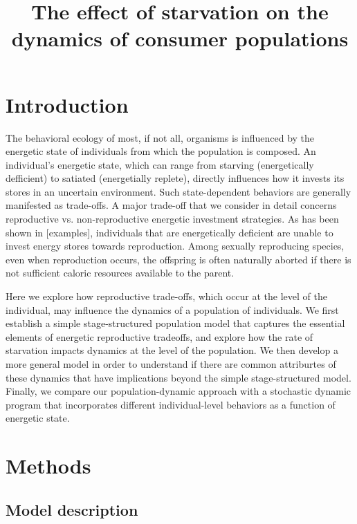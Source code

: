 \documentclass[11pt]{article}
\begin{document}
\title{The effect of starvation on the dynamics of consumer populations}
\maketitle


\section{Introduction}

The behavioral ecology of most, if not all, organisms is influenced by the energetic state of individuals from which the population is composed.
An individual's energetic state, which can range from starving (energetically defficient) to satiated (energetially replete), directly influences how it invests its stores in an uncertain environment.
Such state-dependent behaviors are generally manifested as trade-offs.
A major trade-off that we consider in detail concerns reproductive vs. non-reproductive energetic investment strategies.
As has been shown in [examples], individuals that are energetically deficient are unable to invest energy stores towards reproduction.
Among sexually reproducing species, even when reproduction occurs, the offspring is often naturally aborted if there is not sufficient caloric resources available to the parent.

Here we explore how reproductive trade-offs, which occur at the level of the individual, may influence the dynamics of a population of individuals.
We first establish a simple stage-structured population model that captures the essential elements of energetic reproductive tradeoffs, and explore how the rate of starvation impacts dynamics at the level of the population.
We then develop a more general model in order to understand if there are common attriburtes of these dynamics that have implications beyond the simple stage-structured model.
Finally, we compare our population-dynamic approach with a stochastic dynamic program that incorporates different individual-level behaviors as a function of energetic state.



\section{Methods}
\subsection{Model description}
\end{document}
